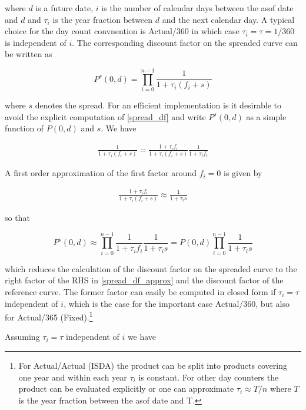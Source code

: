 \documentclass[12pt, a4paper]{article}
\begin{document}
where $d$ is a future date, $i$ is the number of calendar days between the asof date and $d$ and $\tau_i$ is the year
fraction between $d$ and the next calendar day. A typical choice for the day count convnention is Actual/360 in which
case $\tau_i = \tau = 1 / 360$ is independent of $i$. The corresponding discount factor on the spreaded curve can be
written as

\begin{equation}
\label{spread_df}
P^s(0,d) = \prod_{i=0}^{n-1} \frac{1}{1+\tau_i (f_i + s)}
\end{equation}

where $s$ denotes the spread. For an efficient implementation is it desirable to avoid the explicit computation of
\ref{spread_df} and write $P^s(0,d)$ as a simple function of $P(0,d)$ and $s$. We have

\begin{eqnarray*}
  \frac{1}{1+\tau_i (f_i + s)} = \frac{1+\tau_i f_i}{1+\tau_i (f_i + s)} \frac{1}{1+\tau_i f_i}
\end{eqnarray*}

A first order approximation of the first factor around $f_i=0$ is given by

\begin{eqnarray*}
  \frac{1+\tau_i f_i}{1+\tau_i (f_i + s)} \approx \frac{1}{1+\tau_i s}
\end{eqnarray*}

so that

\begin{equation}
 \label{spread_df_approx}
  P^s(0,d) \approx \prod_{i=0}^{n-1} \frac{1}{1+\tau_i f_i} \frac{1}{1+\tau_i s} = P(0,d) \prod_{i=0}^{n-1} \frac{1}{1+\tau_i s}
\end{equation}

which reduces the calculation of the discount factor on the spreaded curve to the right factor of the RHS in
\ref{spread_df_approx} and the discount factor of the reference curve. The former factor can easily be computed in
closed form if $\tau_i = \tau$ independent of $i$, which is the case for the important case Actual/360, but also for
Actual/365 (Fixed).\footnote{For Actual/Actual (ISDA) the product can be split into products covering one year and
  within each year $\tau_i$ is constant. For other day counters the product can be evaluated explicitly or one can
  approximate $\tau_i \approx T / n$ where $T$ is the year fraction between the asof date and T.}

Assuming $\tau_i = \tau$ independent of $i$ we have
\end{document}
